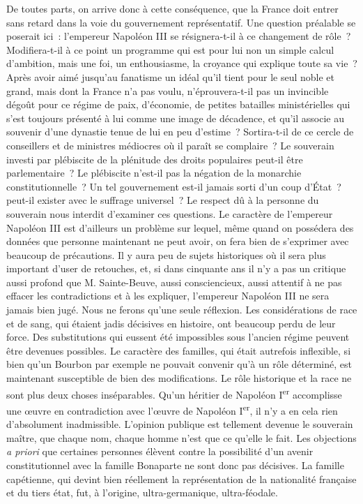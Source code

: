 \documentclass[french,twoside]{book} %
\begin{document}
De toutes parts, on arrive donc à cette conséquence, que la France doit entrer sans retard dans la voie du gouvernement représentatif. Une question préalable se poserait ici : l’empereur Napoléon III se résignera-t-il à ce changement de rôle ? Modifiera-t-il à ce point un programme qui est pour lui non un simple calcul d’ambition, mais une foi, un enthousiasme, la croyance qui explique toute sa vie ? Après avoir aimé jusqu’au fanatisme un idéal qu’il tient pour le seul noble et grand, mais dont la France n’a pas voulu, n’éprouvera-t-il pas un invincible dégoût pour ce régime de paix, d’économie, de petites batailles ministérielles qui s’est toujours présenté à lui comme une image de décadence, et qu’il associe au souvenir d’une dynastie tenue de lui en peu d’estime ? Sortira-t-il de ce cercle de conseillers et de ministres médiocres où il paraît se complaire ? Le souverain investi par plébiscite de la plénitude des droits populaires peut-il être parlementaire ? Le plébiscite n’est-il pas la négation de la monarchie constitutionnelle ? Un tel gouvernement est-il jamais sorti d’un coup d’État ? peut-il exister avec le suffrage universel ? Le respect dû à la personne du souverain nous interdit d’examiner ces questions. Le caractère de l’empereur Napoléon III est d’ailleurs un problème sur lequel, même quand on possédera des données que personne maintenant ne peut avoir, on fera bien de s’exprimer avec beaucoup de précautions. Il y aura peu de sujets historiques où il sera plus important d’user de retouches, et, si dans cinquante ans il n’y a pas un critique aussi profond que M. Sainte-Beuve, aussi consciencieux, aussi attentif à ne pas effacer les contradictions et à les expliquer, l’empereur Napoléon III ne sera jamais bien jugé. Nous ne ferons qu’une seule réflexion. Les considérations de race et de sang, qui étaient jadis décisives en histoire, ont beaucoup perdu de leur force. Des substitutions qui eussent été impossibles sous l’ancien régime peuvent être devenues possibles. Le caractère des familles, qui était autrefois inflexible, si bien qu’un Bourbon par exemple ne pouvait convenir qu’à un rôle déterminé, est maintenant susceptible de bien des modifications. Le rôle historique et la race ne sont plus deux choses inséparables. Qu’un héritier de Napoléon I\textsuperscript{er} accomplisse une œuvre en contradiction avec l’œuvre de Napoléon I\textsuperscript{er}, il n’y a en cela rien d’absolument inadmissible. L’opinion publique est tellement devenue le souverain maître, que chaque nom, chaque homme n’est que ce qu’elle le fait. Les objections {\itshape a priori} que certaines personnes élèvent contre la possibilité d’un avenir constitutionnel avec la famille Bonaparte ne sont donc pas décisives. La famille capétienne, qui devint bien réellement la représentation de la nationalité française et du tiers état, fut, à l’origine, ultra-germanique, ultra-féodale.\par
\end{document}
